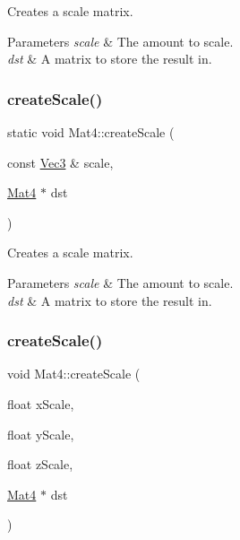 Creates a scale matrix.


\begin{DoxyParams}{Parameters}
{\em scale} & The amount to scale. \\
\hline
{\em dst} & A matrix to store the result in. \\
\hline
\end{DoxyParams}
\mbox{\label{classMat4_a0cb022e5faa5956fbbade37e82210518}} 
\subsubsection{\texorpdfstring{create\+Scale()}{createScale()}\hspace{0.1cm}{\footnotesize\ttfamily [2/4]}}
{\footnotesize\ttfamily static void Mat4\+::create\+Scale (\begin{DoxyParamCaption}\item[{const \hyperlink{classVec3}{Vec3} \&}]{scale,  }\item[{\hyperlink{classMat4}{Mat4} $\ast$}]{dst }\end{DoxyParamCaption})\hspace{0.3cm}{\ttfamily [static]}}

Creates a scale matrix.


\begin{DoxyParams}{Parameters}
{\em scale} & The amount to scale. \\
\hline
{\em dst} & A matrix to store the result in. \\
\hline
\end{DoxyParams}
\mbox{\label{classMat4_a73ac7c88b7d1f1b3105cee306c3bbfde}} 
\subsubsection{\texorpdfstring{create\+Scale()}{createScale()}\hspace{0.1cm}{\footnotesize\ttfamily [3/4]}}
{\footnotesize\ttfamily void Mat4\+::create\+Scale (\begin{DoxyParamCaption}\item[{float}]{x\+Scale,  }\item[{float}]{y\+Scale,  }\item[{float}]{z\+Scale,  }\item[{\hyperlink{classMat4}{Mat4} $\ast$}]{dst }\end{DoxyParamCaption})\hspace{0.3cm}{\ttfamily [static]}}

